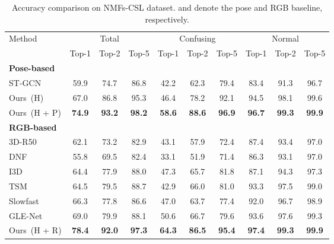 \documentclass[10pt,twocolumn,letterpaper]{article}
\begin{document}
\begin{table*}
\small
\tabcolsep=11.2pt
\begin{center}
\begin{threeparttable}
\begin{tabular}{l|ccc|ccc|ccc}
\hline
\multirow{2}{*}{Method}      &  \multicolumn{3}{c|}{Total} &  \multicolumn{3}{c|}{Confusing} &  \multicolumn{3}{c}{Normal}  \\ 
         & Top-1 & Top-2 & Top-5 & Top-1 & Top-2 & Top-5 & Top-1 & Top-2 & Top-5 \\ \hline \hline 
\textbf{Pose-based}  & & & & & & & & & \\
ST-GCN~\cite{yan2018spatial} & 59.9 & 74.7 & 86.8 & 42.2 & 62.3 & 79.4 & 83.4 & 91.3 & 96.7 \\
Ours~(H)  & 67.0 & 86.8 & 95.3 & 46.4 & 78.2 & 92.1 & 94.5 & 98.1 & 99.6 \\
Ours~(H + P) & \textbf{74.9} & \textbf{93.2} & \textbf{98.2} & \textbf{58.6} & \textbf{88.6} & \textbf{96.9} & \textbf{96.7} & \textbf{99.3} & \textbf{99.9} \\ \hline
\textbf{RGB-based}  & & & & & & & & & \\
3D-R50~\cite{qiu2017learning}  & 62.1 & 73.2 & 82.9 & 43.1 & 57.9 & 72.4 & 87.4 & 93.4 & 97.0 \\
DNF~\cite{cui2019deep}         & 55.8 & 69.5 & 82.4 & 33.1 & 51.9 & 71.4 & 86.3 & 93.1 & 97.0 \\
I3D~\cite{carreira2017quo}     & 64.4 & 77.9 & 88.0 & 47.3 & 65.7 & 81.8 & 87.1 & 94.3 & 97.3 \\
TSM~\cite{lin2019tsm}          & 64.5 & 79.5 & 88.7 & 42.9 & 66.0 & 81.0 & 93.3 & 97.5 & 99.0 \\
Slowfast~\cite{feichtenhofer2019slowfast} & 66.3 & 77.8 & 86.6 & 47.0 & 63.7 & 77.4 & 92.0 & 96.7 & 98.9 \\ 
GLE-Net~\cite{hu2020global}  & 69.0 & 79.9  & 88.1 & 50.6 & 66.7 & 79.6 & 93.6 & 97.6 & 99.3 \\
Ours~(H + R)  & \textbf{78.4} & \textbf{92.0} & \textbf{97.3} & \textbf{64.3} & \textbf{86.5} & \textbf{95.4} & \textbf{97.4} & \textbf{99.3} & \textbf{99.9} \\ \hline
\end{tabular}
\end{threeparttable}
\end{center}
\caption{Accuracy comparison on NMFs-CSL dataset. \cite{yan2018spatial} and \cite{qiu2017learning} denote the pose and RGB baseline, respectively.}
\label{NMFs-CSL}
\vspace{-0.3cm}
\end{table*}
\end{document}
